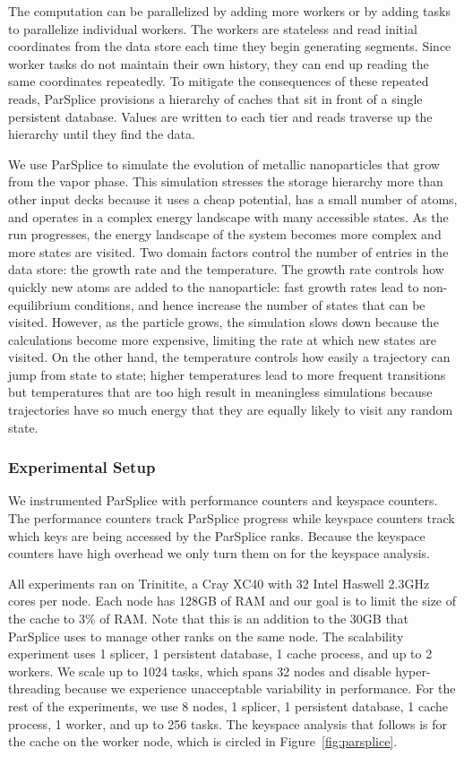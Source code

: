 The computation can be parallelized by adding more workers or by adding tasks
to parallelize individual workers.  The workers are stateless and read initial
coordinates from the data store each time they begin generating segments. Since
worker tasks do not maintain their own history, they can end up reading the
same coordinates repeatedly. To mitigate the consequences of these repeated
reads, ParSplice provisions a hierarchy of caches that sit in front of a single
persistent database.  Values are written to each tier and reads traverse up the
hierarchy until they find the data.  

We use ParSplice to simulate the evolution of metallic nanoparticles that grow
from the vapor phase.  This simulation stresses the storage hierarchy more than
other input decks because it uses a cheap potential, has a small number of
atoms, and operates in a complex energy landscape with many accessible states.
As the run progresses, the energy landscape of the system becomes more complex
and more states are visited.  Two domain factors control the number of entries
in the data store: the growth rate and the temperature. The growth rate
controls how quickly new atoms are added to the nanoparticle: fast growth rates
lead to non-equilibrium conditions, and hence increase the number of states
that can be visited.  However, as the particle grows, the simulation slows down
because the calculations become more expensive, limiting the rate at which new
states are visited.  On the other hand, the temperature controls how easily a
trajectory can jump from state to state; higher temperatures lead to more
frequent transitions but temperatures that are too high result in meaningless
simulations because trajectories have so much energy that they are equally
likely to visit any random state. 

\subsubsection{Experimental Setup}

We instrumented ParSplice with performance counters and keyspace counters.  The
performance counters track ParSplice progress while keyspace counters track
which keys are being accessed by the ParSplice ranks. Because the keyspace
counters have high overhead we only turn them on for the keyspace analysis.

All experiments ran on Trinitite, a Cray XC40 with 32 Intel Haswell 2.3GHz
cores per node.  Each node has 128GB of RAM and our goal is to limit the size
of the cache to 3\% of RAM. Note that this is an addition to the 30GB that
ParSplice uses to manage other ranks on the same node.  The scalability
experiment uses 1 splicer, 1 persistent database, 1 cache process, and up to 2
workers. We scale up to 1024 tasks, which spans 32 nodes and disable
hyper-threading because we experience unacceptable variability in performance.
For the rest of the experiments, we use 8 nodes, 1 splicer, 1 persistent
database, 1 cache process, 1 worker, and up to 256 tasks.  The keyspace
analysis that follows is for the cache on the worker node, which is circled in
Figure~\ref{fig:parsplice}.  


